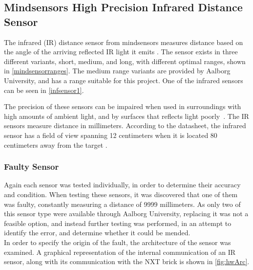 
\medskip

\subsection{Mindsensors High Precision Infrared Distance Sensor} \label{ss:minddist}
The infrared (IR) distance sensor from mindsensors measures distance based on the angle of the arriving reflected IR light it emits \cite{minddata}. The sensor exists in three different variants, short, medium, and long, with different optimal ranges, shown in \cref{mindsensorranges}. The medium range variants are provided by Aalborg University, and has a range suitable for this project. One of the infrared sensors can be seen in \cref{infsensor1}.


The precision of these sensors can be impaired when used in surroundings with high amounts of ambient light, and by surfaces that reflects light poorly~\cite{minddata}. The IR sensors measure distance in millimeters. According to the datasheet, the infrared sensor has a field of view spanning 12 centimeters when it is located 80 centimeters away from the target \cite{mindangle}. \\



\subsubsection{Faulty Sensor}
Again each sensor was tested individually, in order to determine their accuracy and condition. When testing these sensors, it was discovered that one of them was faulty, constantly measuring a distance of 9999 millimeters. As only two of this sensor type were available through Aalborg University, replacing it was not a feasible option, and instead further testing was performed, in an attempt to identify the error, and determine whether it could be mended. \\

In order to specify the origin of the fault, the architecture of the sensor was examined. A graphical representation of the internal communication of an IR sensor, along with its communication with the NXT brick is shown in \cref{fig:hwArc}.

